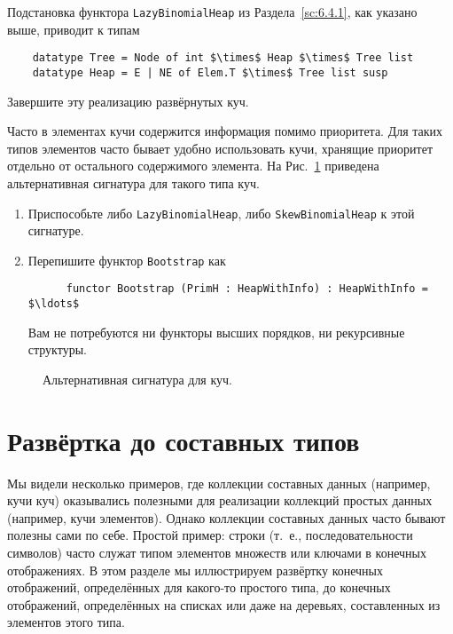 \begin{exercise}\label{ex:10.7}
  Подстановка функтора \lstinline!LazyBinomialHeap! из
  Раздела~\ref{sc:6.4.1}, как указано выше, приводит к типам
  \begin{lstlisting}
    datatype Tree = Node of int $\times$ Heap $\times$ Tree list
    datatype Heap = E | NE of Elem.T $\times$ Tree list susp
  \end{lstlisting}
  Завершите эту реализацию развёрнутых куч.
\end{exercise}

\begin{exercise}\label{ex:10.8}
  Часто в элементах кучи содержится информация помимо приоритета. Для
  таких типов элементов часто бывает удобно использовать кучи,
  хранящие приоритет отдельно от остального содержимого элемента. На
  Рис.~\ref{fig:10.8} приведена альтернативная сигнатура для такого
  типа куч.
  \begin{enumerate}
  \item Приспособьте либо \lstinline!LazyBinomialHeap!, либо
    \lstinline!SkewBinomialHeap! к этой сигнатуре.
  \item Перепишите функтор \lstinline!Bootstrap! как
    \begin{lstlisting}
      functor Bootstrap (PrimH : HeapWithInfo) : HeapWithInfo = $\ldots$
    \end{lstlisting}
    Вам не потребуются ни функторы высших порядков, ни рекурсивные
    структуры.
  \end{enumerate}
\end{exercise}

\begin{figure}
  \centering

  \caption{Альтернативная сигнатура для куч.}
  \label{fig:10.8}
\end{figure}

\section{Развёртка до составных типов}
\label{sc:10.3}

Мы видели несколько примеров, где коллекции составных данных
(например, кучи куч) оказывались полезными для реализации коллекций
простых данных (например, кучи элементов). Однако коллекции составных
данных часто бывают полезны сами по себе.  Простой пример: строки
(т.~е., последовательности символов) часто служат типом
элементов множеств или ключами в конечных отображениях. В этом разделе
мы иллюстрируем развёртку конечных отображений, определённых для
какого-то простого типа, до конечных отображений, определённых на
списках или даже на деревьях, составленных из элементов этого типа.

